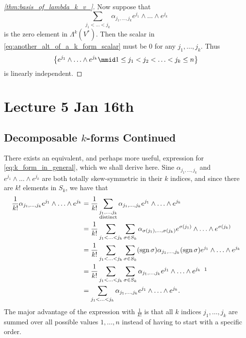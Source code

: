 \documentclass[notoc,notitlepage]{tufte-book}
\DeclareMathOperator{\sgn}{sgn}
\begin{document}
\begin{proof}[\cref{thm:basis_of_lambda_k_v_}]
  Now suppose that
  \begin{equation*}
    \sum_{j_1 < \hdots < j_k} \alpha_{j_1, \ldots, j_k} e^{j_1} \land \hdots \land e^{j_k}
  \end{equation*}
  is the zero element in $\Lambda^k(V^*)$. Then the scalar in \cref{eq:another_alt_of_a_k_form_scalar} must be $0$ for any $j_1, \ldots, j_k$. Thus
  \begin{equation*}
    \left\{ e^{j_1} \land \hdots \land e^{j_k} \mmid 1 \leq j_1 < j_2 < \hdots < j_k \leq n \right\}
  \end{equation*}
  is linearly independent.
\end{proof}



\chapter{Lecture 5 Jan 16th}%
\label{chp:lecture_5_jan_16th}

\section{Decomposable \texorpdfstring{$k$}{k}-forms Continued}%
\label{sec:decomposable_k_forms_continued}

There exists an equivalent, and perhaps more useful, expression for \cref{eq:k_form_in_general},
which we shall derive here. Sine $\alpha_{j_1, \ldots, j_k}$ and
$e^{j_1} \land \hdots \land e^{j_k}$ are both totally skew-symmetric in their $k$ indices,
and since there are $k!$ elements in $S_k$, we have that
\begin{align*}
  \frac{1}{k!} \alpha_{j_1, \ldots, j_k} e^{j_1} \land \hdots \land e^{j_k}
  &= \frac{1}{k!} \sum_{\substack{j_1, \ldots, j_k \\ \text{distinct}}}
    \alpha_{j_1, \ldots, j_k} e^{j_1} \land \hdots \land e^{j_k} \\
  &= \frac{1}{k!} \sum_{j_1 < \hdots < j_k} \sum_{\sigma \in S_k}
    \alpha_{\sigma(j_1), \ldots, \sigma(j_k)} e^{\sigma(j_1)} \land \hdots \land e^{\sigma(j_k)} \\
  &= \frac{1}{k!} \sum_{j_1 < \hdots < j_k} \sum_{\sigma \in S_k} (\sgn \sigma)
    \alpha_{j_1, \ldots, j_k} (\sgn \sigma) e^{j_1} \land \hdots \land e^{j_k} \\
  &= \frac{1}{k!} \sum_{j_1 < \hdots < j_k} \sum_{\sigma \in S_k}
    \alpha_{j_1, \ldots, j_k} e^{j_1} \land \hdots \land e^{j_k} \enspace \footnotemark \\
  &= \sum_{j_1 < \hdots < j_k} \alpha_{j_1, \ldots, j_k} e^{j_1} \land \hdots \land e^{j_k}.
\end{align*}
\footnotetext{Note that $(\sgn \sigma)(\sgn \sigma) = 1$.}
The major advantage of the expression with $\frac{1}{k!}$ is that all $k$ indices
$j_1, \ldots, j_k$ are summed over all possible values $1, \ldots, n$ instead of
having to start with a specific order.
\end{document}
